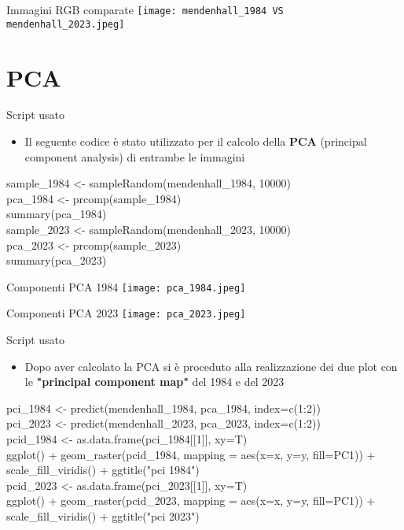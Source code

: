 \documentclass{beamer}
\begin{document}
\begin{frame}{Immagini RGB comparate}
    \texttt{[image: mendenhall\_1984 VS mendenhall\_2023.jpeg]}
    \centering
\end{frame}

\section{PCA}

 \begin{frame}{Script usato}
\begin{itemize}
    \item Il seguente codice è stato utilizzato per il calcolo della \textbf{PCA} (principal component analysis) di entrambe le immagini
\end{itemize}
\bigskip
\small sample\_1984 <- sampleRandom(mendenhall\_1984, 10000)\\pca\_1984 <- prcomp(sample\_1984)\\summary(pca\_1984)\\
\bigskip
\small sample\_2023 <- sampleRandom(mendenhall\_2023, 10000)\\pca\_2023 <- prcomp(sample\_2023)\\summary(pca\_2023)
\end{frame}

\begin{frame}{Componenti PCA 1984}
    \texttt{[image: pca\_1984.jpeg]}
    \centering
\end{frame}

\begin{frame}{Componenti PCA 2023}
    \texttt{[image: pca\_2023.jpeg]}
    \centering
\end{frame}

\begin{frame}{Script usato}
\begin{itemize}
    \item Dopo aver calcolato la PCA si è proceduto alla realizzazione dei due plot con le \textbf{"principal component map"} del 1984 e del 2023
\end{itemize}
\bigskip
\small pci\_1984 <- predict(mendenhall\_1984, pca\_1984, index=c(1:2))\\pci\_2023 <- predict(mendenhall\_2023, pca\_2023, index=c(1:2))\\
\bigskip
pcid\_1984 <- as.data.frame(pci\_1984[[1]], xy=T)\\ggplot() +
geom\_raster(pcid\_1984, mapping = aes(x=x, y=y, fill=PC1)) +
scale\_fill\_viridis() +
ggtitle("pci 1984")\\
\bigskip
pcid\_2023 <- as.data.frame(pci\_2023[[1]], xy=T)\\
ggplot() +
geom\_raster(pcid\_2023, mapping = aes(x=x, y=y, fill=PC1)) +
scale\_fill\_viridis() +
ggtitle("pci 2023")
\end{frame}
\end{document}
